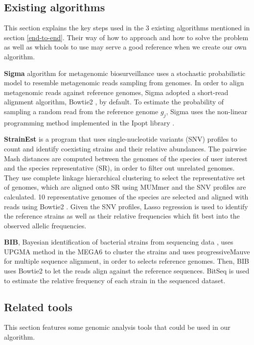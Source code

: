\documentclass{report}
\begin{document}
\subsection{Existing algorithms}
This section explains the key steps used in the 3 existing algorithms mentioned in section \ref{end-to-end}. Their way of how to approach and how to solve the problem as well as which tools to use may serve a good reference when we create our own algorithm.

\textbf{Sigma} algorithm \cite{ahn2015sigma} for metagenomic biosurveillance uses a stochastic probabilistic model to resemble metagenomic reads sampling from genomes. In order to align metagenomic reads against reference genomes, Sigma adopted a short-read alignment algorithm, Bowtie2 \cite{Bowtie}, by default. To estimate the probability of sampling a random read from the reference genome $g_j$, Sigma uses the non-linear programming method implemented in the Ipopt library \cite{Ipopt}. 

\textbf{StrainEst} \cite{StrainEst} is a program that uses single-nucleotide variants (SNV) profiles to count and identify coexisting strains and their relative abundances. The pairwise Mash distances \cite{Mash} are computed between the genomes of the species of user interest and the species representative (SR), in order to filter out unrelated genomes. They use complete linkage hierarchical clustering to select the representative set of genomes, which are aligned onto SR using MUMmer\cite{MUMmer} and the SNV profiles are calculated. 10 representative genomes of the species are selected and aligned with reads using Bowtie2 \cite{Bowtie}. Given the SNV profiles, Lasso regression is used to identify the reference strains as well as their relative frequencies which fit best into the observed allelic frequencies. 

\textbf{BIB}, Bayesian identification of bacterial strains from sequencing data \cite{mbs:/content/journal/mgen/10.1099/mgen.0.000075}, uses UPGMA method in the MEGA6 \cite{MEGA6} to cluster the strains and uses progressiveMauve \cite{progressive} for multiple sequence alignment, in order to selects reference genomes. Then, BIB uses Bowtie2 \cite{Bowtie} to let the reads align against the reference sequences. BitSeq \cite{bitSeq} is used to estimate the relative frequency of each strain in the sequenced dataset.


\subsection{Related tools} 
This section features some genomic analysis tools that could be used in our algorithm.
\end{document}
